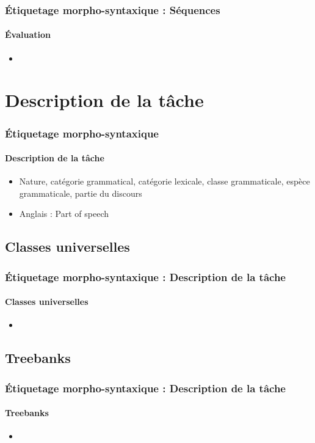 \documentclass[xcolor=table]{beamer}
\begin{document}
\begin{frame}
\frametitle{Étiquetage morpho-syntaxique : Séquences}
\framesubtitle{Évaluation}

\begin{itemize}
	\item 
\end{itemize}

\end{frame}

\section{Description de la tâche}

\begin{frame}
\frametitle{Étiquetage morpho-syntaxique}
\framesubtitle{Description de la tâche}


\begin{itemize}
	\item Nature, catégorie grammatical, catégorie lexicale, classe grammaticale, espèce grammaticale, partie du discours
	\item Anglais : Part of speech 
\end{itemize}

\end{frame}

\subsection{Classes universelles}

\begin{frame}
\frametitle{Étiquetage morpho-syntaxique : Description de la tâche}
\framesubtitle{Classes universelles}


\begin{itemize}
	\item 
\end{itemize}

\end{frame}

\subsection{Treebanks}

\begin{frame}
\frametitle{Étiquetage morpho-syntaxique : Description de la tâche}
\framesubtitle{Treebanks}

\begin{itemize}
	\item 
\end{itemize}

\end{frame}
\end{document}
